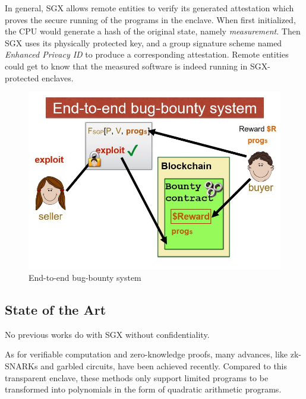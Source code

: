 \documentclass[conference]{IEEEtran}
\begin{document}
In general, SGX allows remote entities to verify its generated attestation which proves the secure running of the programs in the enclave.
%
When first initialized, the CPU would generate a hash of the original state, namely \textsl{measurement}.
%
Then SGX uses its physically protected key, and a group signature scheme named \textsl{Enhanced Privacy ID} to produce a corresponding attestation.
%
Remote entities could get to know that the measured software is indeed running in SGX-protected enclaves.

\begin{figure}[ht]
    \centering
    \includegraphics[width= 0.95\linewidth]{fig/system2.jpg}
    \caption{End-to-end bug-bounty system}
    \label{e2e}
\end{figure}

\subsection{State of the Art}
No previous works do with SGX without confidentiality.

As for verifiable computation and zero-knowledge proofs, many advances, like zk-SNARKs and garbled circuits, have been achieved recently.
%
Compared to this transparent enclave, these methods only support limited programs to be transformed into polynomials in the form of quadratic arithmetic programs.
\end{document}
